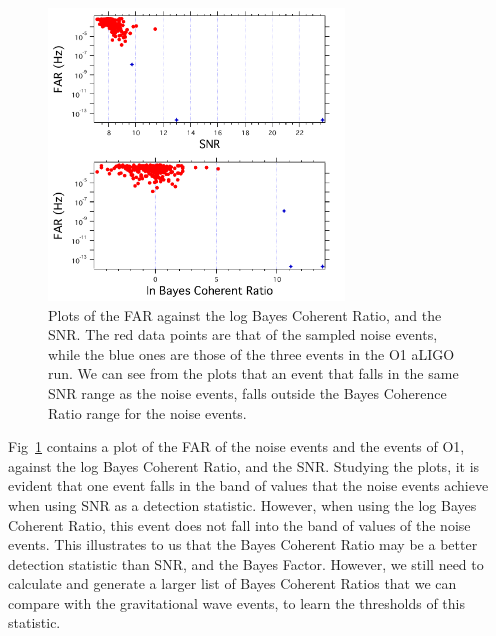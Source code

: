 \documentclass{article}
\begin{document}
 
 \begin{figure}[h]
 	\centering
 	\includegraphics[width=0.7\textwidth]{Figures/eventsOnBackground.pdf} 
 	\caption{Plots of the FAR against the log Bayes Coherent Ratio, and the SNR. The red data points are that of the sampled noise events, while the blue ones are those of the three events in the O1 aLIGO run. We can see from the plots that an event that falls in the same SNR range as the noise events, falls outside the Bayes Coherence Ratio range for the noise events.}
 	\label{Fig:eventsOnBackground}
 \end{figure}
 
 
  Fig~\ref{Fig:eventsOnBackground} contains a plot of the FAR of the noise events and the events of O1, against the log Bayes Coherent Ratio, and the SNR. Studying the plots, it is evident that one event falls in the band of values that the noise events achieve when using SNR as a detection statistic. However, when using the log Bayes Coherent Ratio, this event does not fall into the band of values of the noise events. This illustrates to us that the Bayes Coherent Ratio may be a better detection statistic than SNR, and the Bayes Factor. However, we still need to calculate and generate a larger list of Bayes Coherent Ratios that we can compare with the gravitational wave events, to learn the thresholds of this statistic.
 
 
 
 
 
 
% 
% 
% 
\end{document}
